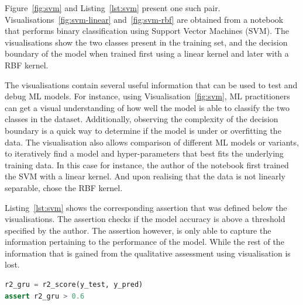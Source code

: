 \documentclass[conference]{IEEEtran}
\begin{document}
Figure~\ref{fig:svm} and Listing~\ref{lst:svm} present one such pair. Visualisations~\ref{fig:svm-linear} and~\ref{fig:svm-rbf} are obtained from a notebook that performs binary classification using Support Vector Machines (SVM). The visualisations show the two classes present in the training set, and the decision boundary of the model when trained first using a linear kernel and later with a RBF kernel.

The visualisations contain several useful information that can be used to test and debug ML models. For instance, using Visualisation~\ref{fig:svm}, ML practitioners can get a visual understanding of how well the model is able to classify the two classes in the dataset. Additionally, observing the complexity of the decision boundary is a quick way to determine if the model is under or overfitting the data. The visualisation also allows comparison of different ML models or variants, to iteratively find a model and hyper-parameters that best fits the underlying training data. In this case for instance, the author of the notebook first trained the SVM with a linear kernel. And upon realising that the data is not linearly separable, chose the RBF kernel.

Listing~\ref{lst:svm} shows the corresponding assertion that was defined below the visualisations. The assertion checks if the model accuracy is above a threshold specified by the author. The assertion however, is only able to capture the information pertaining to the performance of the model. While the rest of the information that is gained from the qualitative assessment using visualisation is lost.

\begin{lstlisting}[language=Python, caption={Assertion to check that the Coefficient of Determination ($R^2$) is higher than the specified threshold.}, label={lst:r2}]
r2_gru = r2_score(y_test, y_pred)
assert r2_gru > 0.6
\end{lstlisting}
\end{document}
